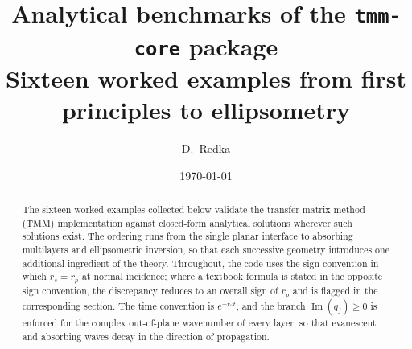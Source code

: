 \documentclass[aps,prb,onecolumn,superscriptaddress,nofootinbib,11pt]{revtex4-2}
\newcommand{\ii}{\mathrm{i}}
\DeclareMathOperator{\Imy}{Im}
\begin{document}
\title{Analytical benchmarks of the \texttt{tmm-core} package\\[2pt]
\large\normalfont Sixteen worked examples from first principles to ellipsometry}
\author{D.~Redka}
\date{\today}

\begin{abstract}
The sixteen worked examples collected below validate the transfer-matrix
method (TMM) implementation against closed-form analytical solutions
wherever such solutions exist. The ordering runs from the single planar
interface to absorbing multilayers and ellipsometric inversion, so that
each successive geometry introduces one additional ingredient of the
theory. Throughout, the code uses the sign convention in which $r_s = r_p$
at normal incidence; where a textbook formula is stated in the opposite
sign convention, the discrepancy reduces to an overall sign of $r_p$ and
is flagged in the corresponding section. The time convention is
$e^{-\ii\omega t}$, and the branch $\Imy(q_j)\ge 0$ is enforced for the
complex out-of-plane wavenumber of every layer, so that evanescent and
absorbing waves decay in the direction of propagation.
\end{abstract}

\maketitle

\tableofcontents

















\end{document}
